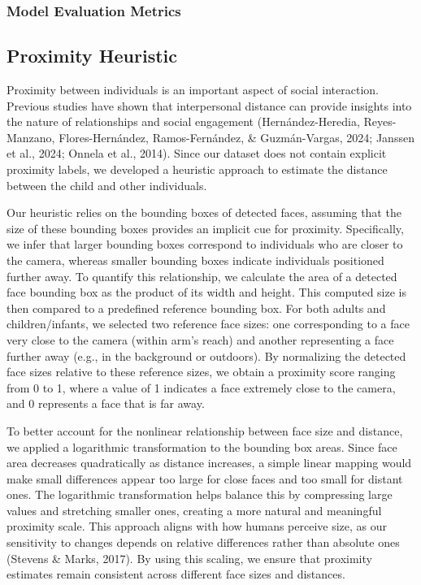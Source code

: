 \documentclass[
  man,floatsintext]{apa6}
\begin{document}
\subsubsection{Model Evaluation Metrics}\label{model-evaluation-metrics-1}

\subsection{Proximity Heuristic}\label{proximity-heuristic}

Proximity between individuals is an important aspect of social interaction. Previous studies have shown that interpersonal distance can provide insights into the nature of relationships and social engagement (Hernández-Heredia, Reyes-Manzano, Flores-Hernández, Ramos-Fernández, \& Guzmán-Vargas, 2024; Janssen et al., 2024; Onnela et al., 2014). Since our dataset does not contain explicit proximity labels, we developed a heuristic approach to estimate the distance between the child and other individuals.

Our heuristic relies on the bounding boxes of detected faces, assuming that the size of these bounding boxes provides an implicit cue for proximity. Specifically, we infer that larger bounding boxes correspond to individuals who are closer to the camera, whereas smaller bounding boxes indicate individuals positioned further away. To quantify this relationship, we calculate the area of a detected face bounding box as the product of its width and height. This computed size is then compared to a predefined reference bounding box. For both adults and children/infants, we selected two reference face sizes: one corresponding to a face very close to the camera (within arm's reach) and another representing a face further away (e.g., in the background or outdoors). By normalizing the detected face sizes relative to these reference sizes, we obtain a proximity score ranging from 0 to 1, where a value of 1 indicates a face extremely close to the camera, and 0 represents a face that is far away.

To better account for the nonlinear relationship between face size and distance, we applied a logarithmic transformation to the bounding box areas. Since face area decreases quadratically as distance increases, a simple linear mapping would make small differences appear too large for close faces and too small for distant ones. The logarithmic transformation helps balance this by compressing large values and stretching smaller ones, creating a more natural and meaningful proximity scale. This approach aligns with how humans perceive size, as our sensitivity to changes depends on relative differences rather than absolute ones (Stevens \& Marks, 2017). By using this scaling, we ensure that proximity estimates remain consistent across different face sizes and distances.
\end{document}
